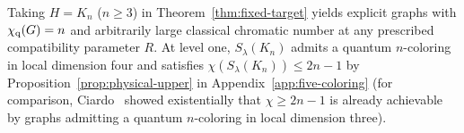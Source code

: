 Taking $H=K_n$ ($n\ge3$) in Theorem~\ref{thm:fixed-target} yields explicit graphs with $\chi_{\mathrm q}(G)=n$ and arbitrarily large classical chromatic number at any prescribed compatibility parameter $R$. At level one, $S_\lambda(K_n)$ admits a quantum $n$-coloring in local dimension four and satisfies $\chi(S_\lambda(K_n))\le2n-1$ by Proposition~\ref{prop:physical-upper} in Appendix~\ref{app:five-coloring} (for comparison, Ciardo~\cite[Corollary~35]{Ciardo24} showed existentially that $\chi\ge2n-1$ is already achievable by graphs admitting a quantum $n$-coloring in local dimension three).
